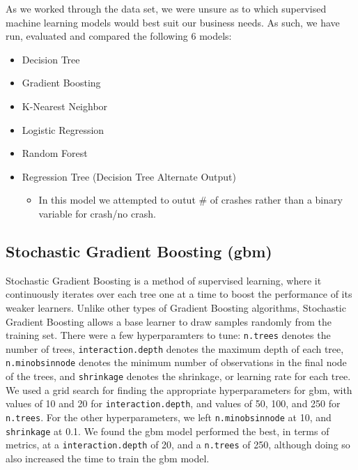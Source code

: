 As we worked through the data set, we were unsure as to which supervised
machine learning models would best suit our business needs. As such, we
have run, evaluated and compared the following 6 models:

\begin{itemize}
\tightlist
\item
  Decision Tree
\item
  Gradient Boosting
\item
  K-Nearest Neighbor
\item
  Logistic Regression
\item
  Random Forest
\item
  Regression Tree (Decision Tree Alternate Output)

  \begin{itemize}
  \tightlist
  \item
    In this model we attempted to outut \# of crashes rather than a
    binary variable for crash/no crash.
  \end{itemize}
\end{itemize}

\hypertarget{stochastic-gradient-boosting-gbm}{%
\subsection{Stochastic Gradient Boosting
(gbm)}\label{stochastic-gradient-boosting-gbm}}

Stochastic Gradient Boosting is a method of supervised learning, where
it continuously iterates over each tree one at a time to boost the
performance of its weaker learners. Unlike other types of Gradient
Boosting algorithms, Stochastic Gradient Boosting allows a base learner
to draw samples randomly from the training set. There were a few
hyperparamters to tune: \texttt{n.trees} denotes the number of trees,
\texttt{interaction.depth} denotes the maximum depth of each tree,
\texttt{n.minobsinnode} denotes the minimum number of observations in
the final node of the trees, and \texttt{shrinkage} denotes the
shrinkage, or learning rate for each tree. We used a grid search for
finding the appropriate hyperparameters for gbm, with values of 10 and
20 for \texttt{interaction.depth}, and values of 50, 100, and 250 for
\texttt{n.trees}. For the other hyperparameters, we left
\texttt{n.minobsinnode} at 10, and \texttt{shrinkage} at 0.1. We found
the gbm model performed the best, in terms of metrics, at a
\texttt{interaction.depth} of 20, and a \texttt{n.trees} of 250,
although doing so also increased the time to train the gbm model.

